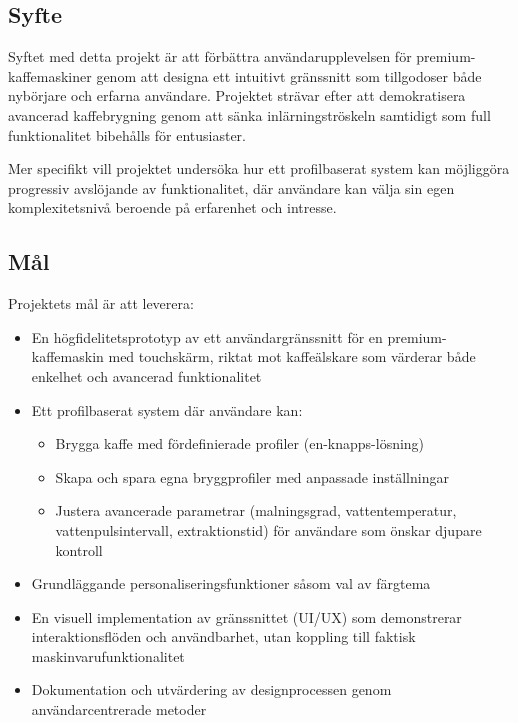 \subsection{Syfte}

Syftet med detta projekt är att förbättra användarupplevelsen för premium-kaffemaskiner genom att designa ett intuitivt gränssnitt som tillgodoser både nybörjare och erfarna användare. Projektet strävar efter att demokratisera avancerad kaffebrygning genom att sänka inlärningströskeln samtidigt som full funktionalitet bibehålls för entusiaster.

Mer specifikt vill projektet undersöka hur ett profilbaserat system kan möjliggöra progressiv avslöjande av funktionalitet, där användare kan välja sin egen komplexitetsnivå beroende på erfarenhet och intresse.


\subsection{Mål}

Projektets mål är att leverera:

\begin{itemize}
    \item En högfidelitetsprototyp av ett användargränssnitt för en premium-kaffemaskin med touchskärm, riktat mot kaffeälskare som värderar både enkelhet och avancerad funktionalitet

    \item Ett profilbaserat system där användare kan:
    \begin{itemize}
        \item Brygga kaffe med fördefinierade profiler (en-knapps-lösning)
        \item Skapa och spara egna bryggprofiler med anpassade inställningar
        \item Justera avancerade parametrar (malningsgrad, vattentemperatur, vattenpulsintervall, extraktionstid) för användare som önskar djupare kontroll
    \end{itemize}

    \item Grundläggande personaliseringsfunktioner såsom val av färgtema

    \item En visuell implementation av gränssnittet (UI/UX) som demonstrerar interaktionsflöden och användbarhet, utan koppling till faktisk maskinvarufunktionalitet

    \item Dokumentation och utvärdering av designprocessen genom användarcentrerade metoder
\end{itemize}


